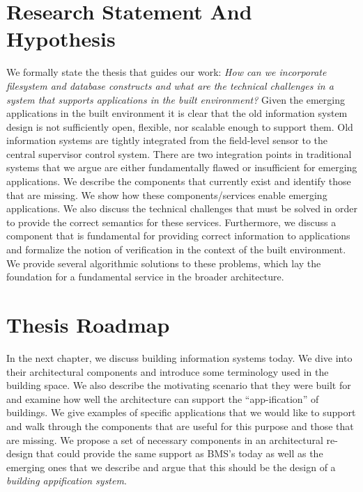 \section{Research Statement And Hypothesis}
We formally state the thesis that guides our work: %
\emph{How can we incorporate filesystem and database constructs and what are the technical challenges in a system that supports applications
in the built environment?}
Given the emerging applications in
the built environment it is clear that the old information system design is not sufficiently open, flexible, nor
scalable enough to support them.  Old information systems are tightly integrated from the field-level sensor to
the central supervisor control system.  There are two integration points in traditional systems that we argue 
are either fundamentally flawed or insufficient for emerging applications.  We describe the components that 
currently exist and identify those that are missing.  We show how these components/services enable emerging applications.  We also
discuss the technical challenges that must be solved in order to provide the correct semantics for these services.
Furthermore, we discuss a component that is fundamental for providing correct information to applications 
and formalize the notion of verification in the context of the built environment.  We provide several algorithmic 
solutions to these problems, which lay the foundation for a fundamental service in the broader architecture.


\section{Thesis Roadmap}
In the next chapter, we discuss building information systems today.  We dive into their architectural components and introduce some terminology
used in the building space.  We also describe the motivating scenario that they were built for and examine how well the architecture 
can support the ``app-ification'' of buildings.  We give examples of specific applications that we would like to support
and walk through the components that are useful for this purpose and those that are missing.  We propose a set of necessary
components in an architectural re-design that could provide the same support as BMS's today as well as the emerging ones that we
describe and argue that this should be the design of a \emph{building appification system}.

